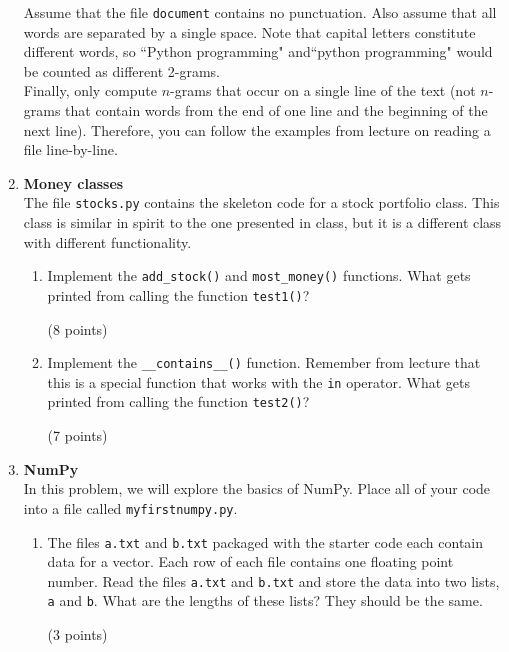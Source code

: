 \documentclass{article}
\newcounter{points}
\newcommand\setpoints[1]{\addtocounter{points}{#1}(#1 points)}
\begin{document}
\begin{enumerate}
Assume that the file \texttt{document} contains no punctuation.  Also assume that all words are separated by a single space. Note that capital letters constitute different words, so ``Python programming" and``python programming" would be counted as different 2-grams. \\

Finally, only compute $n$-grams that occur on a single line of the text (not $n$-grams that contain words from the end of one line and the beginning of the next line).  Therefore, you can follow the examples from lecture on reading a file line-by-line. \\

\item \textbf{Money classes} \\
The file \texttt{stocks.py} contains the skeleton code for a stock portfolio class.  This class is similar in spirit to the one presented in class, but it is a different class with different functionality.

\begin{enumerate}
\item Implement the \texttt{add\_stock()} and \texttt{most\_money()} functions.  What gets printed from calling the function \texttt{test1()}? \setpoints{8}
\end{enumerate}

\begin{enumerate}
\setcounter{enumii}{1}
\item Implement the \texttt{\_\_contains\_\_()} function.  Remember from lecture that this is a special function that works with the \texttt{in} operator.  What gets printed from calling the function \texttt{test2()}? \setpoints{7}
\end{enumerate}

\newpage
\item \textbf{NumPy} \\
In this problem, we will explore the basics of NumPy.  Place all of your code into a file called \texttt{myfirstnumpy.py}.

\begin{enumerate}
\item The files \texttt{a.txt} and \texttt{b.txt} packaged with the starter code each contain data for a vector.  Each row of each file contains one floating point number.  Read the files \texttt{a.txt} and \texttt{b.txt} and store the data into two lists, \texttt{a} and \texttt{b}.  What are the lengths of these lists?  They should be the same.  \setpoints{3}
\end{enumerate}


\end{enumerate}
\end{document}
